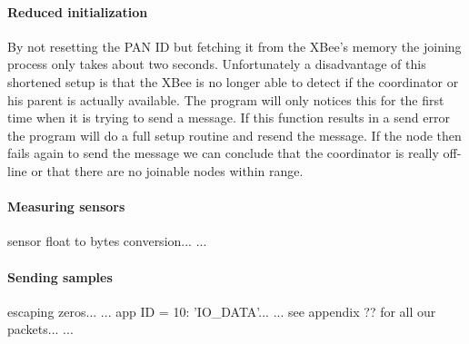 \paragraph{Reduced initialization}
By not resetting the PAN ID but fetching it from the XBee's memory the joining process only takes about two seconds. Unfortunately a disadvantage of this shortened setup is that the XBee is no longer able to detect if the coordinator or his parent is actually available. The program will only notices this for the first time when it is trying to send a message. If this function results in a send error the program will do a full setup routine and resend the message. If the node then fails again to send the message we can conclude that the coordinator is really off-line or that there are no joinable nodes within range. 


\paragraph{Measuring sensors}
sensor float to bytes conversion... ...
\paragraph{Sending samples}
escaping zeros... ...
app ID = 10: 'IO\_DATA'... ...
see appendix ?? for all our packets... ...
